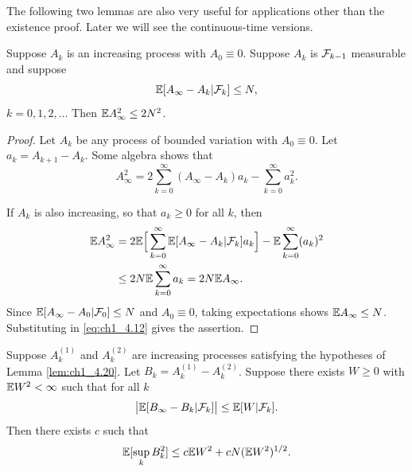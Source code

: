The following two lemmas are also very useful for applications other than the existence proof. Later we will see the continuous-time versions.

\begin{lemma}\label{lem:ch1_4.20}
Suppose $A_k$ is an increasing process with $A_0 \equiv 0$. Suppose $A_k$ is $\mathcal{F}_{k-1}$ measurable and suppose
\begin{equation}\label{eq:ch1_4.10}
    \mathbb{E}[A_\infty - A_k| \mathcal{F}_k] \leq N,
\end{equation}
$k = 0,1,2,\ldots$ Then $\mathbb{E} A_\infty^2 \leq 2N^2$.
\end{lemma}

\begin{proof}
Let $A_k$ be any process of bounded variation with $A_0 \equiv 0$. Let $a_k = A_{k+1} - A_k$. Some algebra shows that
\begin{equation}\label{eq:ch1_4.11}
    A_\infty^2 = 2\sum_{k=0}^{\infty}(A_\infty - A_k)a_k - \sum_{k=0}^{\infty} a_k^2.
\end{equation}

If $A_k$ is also increasing, so that $a_k \geq 0$ for all $k$, then
\begin{align}\label{eq:ch1_4.12}
    \mathbb{E} A_\infty^2 &= 2\mathbb{E}\Big[\sum_{k=0}^{\infty}\mathbb{E}[A_\infty - A_k| \mathcal{F}_k]a_k\Big] - \mathbb{E} \sum_{k=0}^{\infty}(a_k)^2 \\
    &\leq 2N\mathbb{E} \sum_{k=0}^{\infty} a_k = 2N\mathbb{E} A_\infty. \notag
\end{align}
Since $\mathbb{E}[A_\infty - A_0| \mathcal{F}_0] \leq N$ and $A_0 \equiv 0$, taking expectations shows $\mathbb{E} A_\infty \leq N$. Substituting in \eqref{eq:ch1_4.12} gives the assertion.
\end{proof}

\begin{lemma}\label{lem:ch1_4.21}
Suppose $A_k^{(1)}$ and $A_k^{(2)}$ are increasing processes satisfying the hypotheses of Lemma \ref{lem:ch1_4.20}. Let $B_k = A_k^{(1)} - A_k^{(2)}$. Suppose there exists $W \geq 0$ with $\mathbb{E} W^2 < \infty$ such that for all $k$
\begin{equation}\label{eq:ch1_4.13}
    \big|\mathbb{E}[B_\infty - B_k| \mathcal{F}_k]\big| \leq \mathbb{E}[W| \mathcal{F}_k].
\end{equation}
Then there exists $c$ such that
\[
    \mathbb{E}[\sup_k B_k^2] \leq c\mathbb{E} W^2 + cN(\mathbb{E} W^2)^{1/2}.
\]
\end{lemma}

